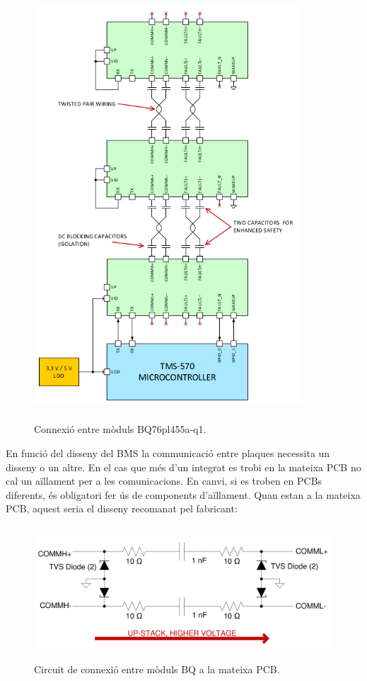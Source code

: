 \begin{figure}[H]
	\centering
    \includegraphics[width=10cm, height=16cm] {Prototip/diagramacomunicacion.png}
    \caption{Connexió entre mòduls BQ76pl455a-q1.}
\end{figure}

\newpage 

En funció del disseny del BMS la communicació entre plaques necessita un disseny o un altre. En el cas que més d'un integrat es trobi en la mateixa PCB no cal un aïllament per a les comunicacions. En canvi, si es troben en PCBs diferents, és obligatori fer ús de components d'aïllament. Quan estan a la mateixa PCB, aquest seria el disseny recomanat pel fabricant:

\begin{figure}[H]
	\centering
    \includegraphics[width=12cm, height=5cm] {Prototip/esquemasamepcb.png}
    \caption{Circuit de connexió entre mòduls BQ a la mateixa PCB.}
\end{figure}

